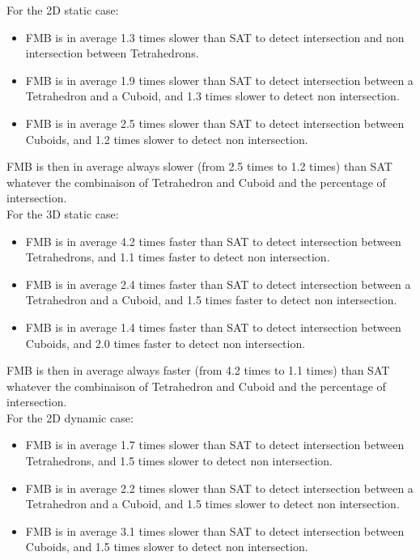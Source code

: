 \documentclass[12pt, a4paper]{article}
\begin{document}
For the 2D static case:\\

\begin{itemize}
\item FMB is in average 1.3 times slower than SAT to detect intersection and non intersection between Tetrahedrons.\\
\item FMB is in average 1.9 times slower than SAT to detect intersection between a Tetrahedron and a Cuboid, and 1.3 times slower to detect non intersection.\\
\item FMB is in average 2.5 times slower than SAT to detect intersection between Cuboids, and 1.2 times slower to detect non intersection.\\
\end{itemize}

FMB is then in average always slower (from 2.5 times to 1.2 times) than SAT whatever the combinaison of Tetrahedron and Cuboid and the percentage of intersection.\\ 

For the 3D static case:\\

\begin{itemize}
\item FMB is in average 4.2 times faster than SAT to detect intersection between Tetrahedrons, and 1.1 times faster to detect non intersection.\\
\item FMB is in average 2.4 times faster than SAT to detect intersection between a Tetrahedron and a Cuboid, and 1.5 times faster to detect non intersection.\\
\item FMB is in average 1.4 times faster than SAT to detect intersection between Cuboids, and 2.0 times faster to detect non intersection.\\
\end{itemize}

FMB is then in average always faster (from 4.2 times to 1.1 times) than SAT whatever the combinaison of Tetrahedron and Cuboid and the percentage of intersection.\\ 

For the 2D dynamic case:\\

\begin{itemize}
\item FMB is in average 1.7 times slower than SAT to detect intersection between Tetrahedrons, and 1.5 times slower to detect non intersection.\\
\item FMB is in average 2.2 times slower than SAT to detect intersection between a Tetrahedron and a Cuboid, and 1.5 times slower to detect non intersection.\\
\item FMB is in average 3.1 times slower than SAT to detect intersection between Cuboids, and 1.5 times slower to detect non intersection.\\
\end{itemize}
\end{document}
